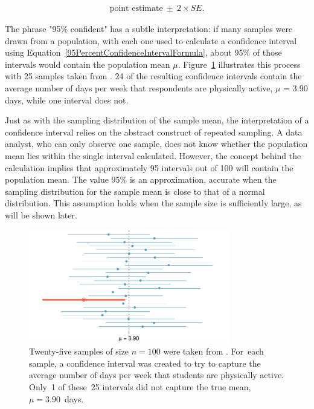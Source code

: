 \begin{spacing}{1.5}
\begin{align}
\text{point estimate}\ \pm\ 2\times SE.
\label{95PercentConfidenceIntervalFormula}
\end{align}

The phrase "95\% confident" has a subtle interpretation: if many samples were drawn from a population, with each one used to calculate a confidence interval using Equation~\ref{95PercentConfidenceIntervalFormula}, about 95\% of those intervals would contain the population mean $\mu$. Figure~\ref{95PercentConfidenceInterval} illustrates this process with 25 samples taken from . 24 of the resulting confidence intervals contain the average number of days per week that respondents are physically active, $\mu$ = 3.90 days, while one interval does not. 

Just as with the sampling distribution of the sample mean, the interpretation of a confidence interval relies on the abstract construct of repeated sampling. A data analyst, who can only observe one sample, does not know whether the population mean lies within the single interval calculated. However, the concept behind the calculation implies that approximately 95 intervals out of 100 will contain the population mean. The value 95\% is an approximation, accurate when the sampling distribution for the sample mean is close to that of a normal distribution. This assumption holds when the sample size is sufficiently large, as will be shown later.

\begin{figure}[hht]
   \centering
   \includegraphics[width=0.78\textwidth]
{ch_inference_foundations_oi_biostat/figures/95PercentConfidenceInterval/95PercentConfidenceInterval}
   \caption{Twenty-five samples of size $n=100$ were taken from . For~each sample, a confidence interval was created to try to capture the average number of days per week that students are physically active. Only~1 of these~25 intervals did not capture the true mean, $\mu = 3.90$~days.}
   \label{95PercentConfidenceInterval}
\end{figure}


\end{spacing}
